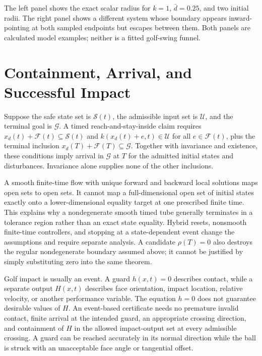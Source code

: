 \documentclass[12pt, openany]{book}
\theoremstyle{plain}
\begin{document}
The left panel shows the exact scalar radius for $k=1$, $\bar d=0.25$, and two initial radii. The right panel shows a different system whose boundary appears inward-pointing at both sampled endpoints but escapes between them. Both panels are calculated model examples; neither is a fitted golf-swing funnel.

\section{Containment, Arrival, and Successful Impact}

Suppose the safe state set is $\mathcal S(t)$, the admissible input set is $\mathcal U$, and the terminal goal is $\mathcal G$. A timed reach-and-stay-inside claim requires $x_d(t)+\mathcal F(t)\subseteq\mathcal S(t)$ and $k(x_d(t)+e,t)\in\mathcal U$ for all $e\in\mathcal F(t)$, plus the terminal inclusion $x_d(T)+\mathcal F(T)\subseteq\mathcal G$. Together with invariance and existence, these conditions imply arrival in $\mathcal G$ at $T$ for the admitted initial states and disturbances. Invariance alone supplies none of the other inclusions.

A smooth finite-time flow with unique forward and backward local solutions maps open sets to open sets. It cannot map a full-dimensional open set of initial states exactly onto a lower-dimensional equality target at one prescribed finite time. This explains why a nondegenerate smooth timed tube generally terminates in a tolerance region rather than an exact state equality. Hybrid resets, nonsmooth finite-time controllers, and stopping at a state-dependent event change the assumptions and require separate analysis. A candidate $\rho(T)=0$ also destroys the regular nondegenerate boundary assumed above; it cannot be justified by simply substituting zero into the same theorem.

Golf impact is usually an event. A guard $h(x,t)=0$ describes contact, while a separate output $H(x,t)$ describes face orientation, impact location, relative velocity, or another performance variable. The equation $h=0$ does not guarantee desirable values of $H$. An event-based certificate needs no premature invalid contact, finite arrival at the intended guard, an appropriate crossing direction, and containment of $H$ in the allowed impact-output set at every admissible crossing. A guard can be reached accurately in its normal direction while the ball is struck with an unacceptable face angle or tangential offset.
\end{document}
